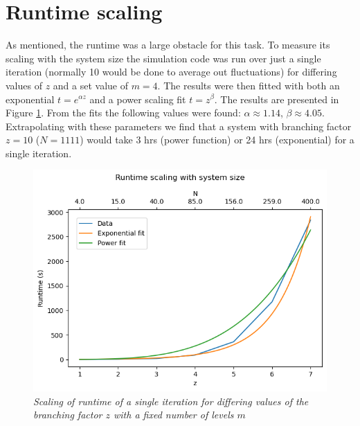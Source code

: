 \section{Runtime scaling}

As mentioned, the runtime was a large obstacle for this task. To measure its scaling with the system size the simulation code was run over just a single iteration (normally 10 would be done to average out fluctuations) for differing values of $z$ and a set value of $m = 4$. The results were then fitted with both an exponential $t = e^{\alpha z}$ and a power scaling fit $t = z^\beta$. The results are presented in Figure \ref{time_scaling}. From the fits the following values were found: $\alpha \approx 1.14$, $\beta \approx 4.05$. Extrapolating with these parameters we find that a system with branching factor $z = 10$ ($N = 1111$) would take 3 hrs (power function) or 24 hrs (exponential) for a single iteration.

\begin{figure}[H]
    \centering
    \includegraphics[width=0.8\linewidth]{images/time_scaling.png}
    \caption{\textit{Scaling of runtime of a single iteration for differing values of the branching factor $z$ with a fixed number of levels $m$}}
    \label{time_scaling}
\end{figure}


\newpage